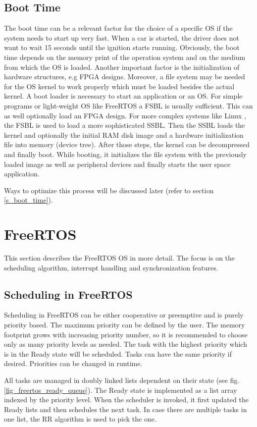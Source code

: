 \subsection{Boot Time}\label{ss_boot_time_general}
The boot time can be a relevant factor for the choice of a specific \ac{OS} if the system needs to start up very fast.
When a car is started, the driver does not want to wait 15 seconds until the ignition starts running.
Obviously, the boot time depends on the memory print of the operation system and on the medium from which the \ac{OS} is loaded.
Another important factor is the initialization of hardware structures, e.g \ac{FPGA} designs.
Moreover, a file system may be needed for the \ac{OS} kernel to work properly which must be loaded besides the actual kernel. 
A boot loader is necessary to start an application or an \ac{OS}.
For simple programs or light-weight \ac{OS} like FreeRTOS a \ac{FSBL} is usually sufficient.
This can as well optionally load an \ac{FPGA} design.
For more complex systems like Linux \cite{jones:itlbp}, the \ac{FSBL} is used to load a more sophisticated \ac{SSBL}.
Then the \ac{SSBL} loads the kernel and optionally the initial RAM disk image and a hardware initialization file into memory (device tree).
After those steps, the kernel can be decompressed and finally boot.
While booting, it initializes the file system with the previously loaded image as well as peripheral devices and finally starts the user space application. 
\par
Ways to optimize this process will be discussed later (refer to section \ref{s_boot_time}).

\section{FreeRTOS}
This section describes the FreeRTOS \ac{OS} in more detail.
The focus is on the scheduling algorithm, interrupt handling and synchronization features.

\subsection{Scheduling in FreeRTOS}\label{ss_scheduling_in_freertos}
Scheduling in FreeRTOS \cite{freertos} can be either cooperative or preemptive and is purely priority based.
The maximum priority can be defined by the user. 
The memory footprint grows with increasing priority number, so it is recommended to choose only as many priority levels as needed.
The task with the highest priority which is in the Ready state will be scheduled. 
Tasks can have the same priority if desired.
Priorities can be changed in runtime.
\par
All tasks are managed in doubly linked lists dependent on their state (see fig. \ref{fig_freertos_ready_queue}). 
The Ready state is implemented as a list array indexed by the priority level. 
When the scheduler is invoked, it first updated the Ready lists and then schedules the next task.
In case there are multiple tasks in one list, the \ac{RR} algorithm is used to pick the one.

